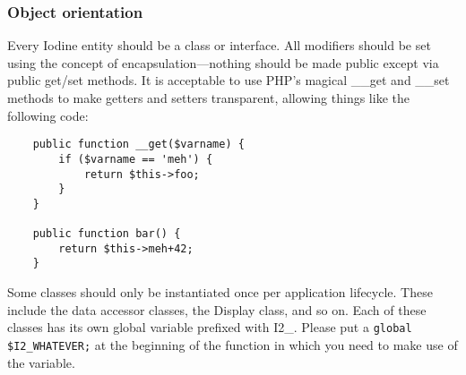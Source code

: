 \documentclass[11pt,letterpaper]{report}
\begin{document}
\subsubsection{Object orientation}
Every Iodine entity should be a class or interface.  All modifiers should be set using the concept of encapsulation---nothing
should be made public except via public get/set methods.  It is acceptable to use PHP's magical \_\_get and \_\_set methods to 
make getters and setters transparent, allowing things like the following code:
\begin{lstlisting}
	public function __get($varname) {
		if ($varname == 'meh') {
			return $this->foo;
		}
	}

	public function bar() {
		return $this->meh+42;
	}
\end{lstlisting}
Some classes should only be instantiated once per application lifecycle.  
These include the data accessor classes, the Display class, and so on.  Each of these classes has its own global variable
prefixed with I2\_.  Please put a \lstinline{global $I2_WHATEVER;}
at the beginning of the function in which you need to make use of the variable.
\end{document}
